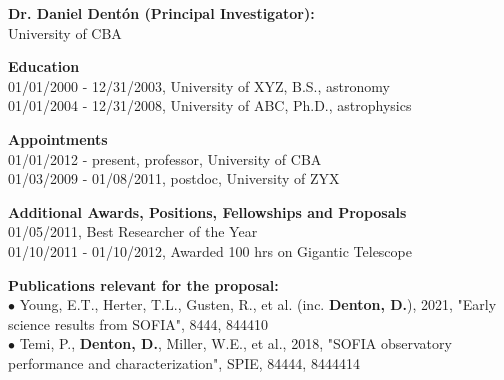 %
\textbf{\color{Blue}\large Dr. Daniel Dent{\'o}n (Principal Investigator):}\\
University of CBA
\par \vspace{-0.5em}
\textbf{Education}\\
01/01/2000 - 12/31/2003, University of XYZ, B.S., astronomy\\
01/01/2004 - 12/31/2008, University of ABC, Ph.D., astrophysics
\par \vspace{-0.5em}
\textbf{Appointments}\\
01/01/2012 - present, professor, University of CBA\\
01/03/2009 - 01/08/2011, postdoc, University of ZYX
\par \vspace{-0.5em}
\textbf{Additional Awards, Positions, Fellowships and Proposals}\\
01/05/2011, Best Researcher of the Year\\
01/10/2011 - 01/10/2012, Awarded 100 hrs on Gigantic Telescope
\par \vspace{-0.5em}
\textbf{Publications relevant for the proposal:}\\
{\scriptsize{$\bullet$}} Young, E.T., Herter, T.L., Gusten, R., et al. (inc. \textbf{Denton, D.}), 2021, "Early science results from SOFIA", 8444, 844410\\
{\scriptsize{$\bullet$}} Temi, P., \textbf{Denton, D.}, Miller, W.E., et al., 2018, "SOFIA observatory performance and characterization", SPIE, 84444, 8444414\\
